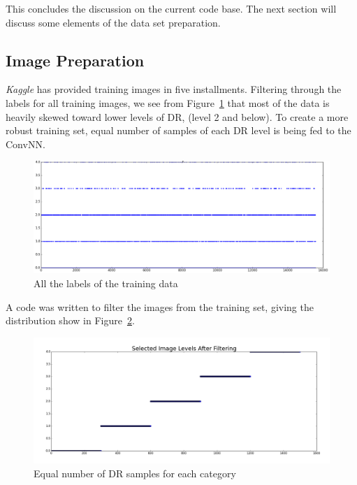 \documentclass[letterpaper,12pt]{article}
\newcommand{\figref}[1]{Figure~\ref{#1}}
\begin{document}
This concludes the discussion on the current code base. The next section will discuss some elements of the data set preparation.

\subsection{Image Preparation}
\textit{Kaggle} has provided training images in five installments. Filtering through the labels for all training images, we see from \figref{fullSample} that most of the data is heavily skewed toward lower levels of DR, (level 2 and below). To create a more robust training set, equal number of samples of each DR level is being fed to the ConvNN. 

\begin{figure}[htbp]
\begin{center}
\includegraphics[scale=0.25]{images/FullSample.png}
\caption{All the labels of the training data}
\label{fullSample}
\end{center}
\end{figure}

A code was written to filter the images from the training set, giving the distribution show in \figref{filtered}.

\begin{figure}[htbp]
\begin{center}
\includegraphics[scale=0.25]{images/After_filtering.png}
\caption{Equal number of DR samples for each category}
\label{filtered}
\end{center}
\end{figure}
\end{document}
